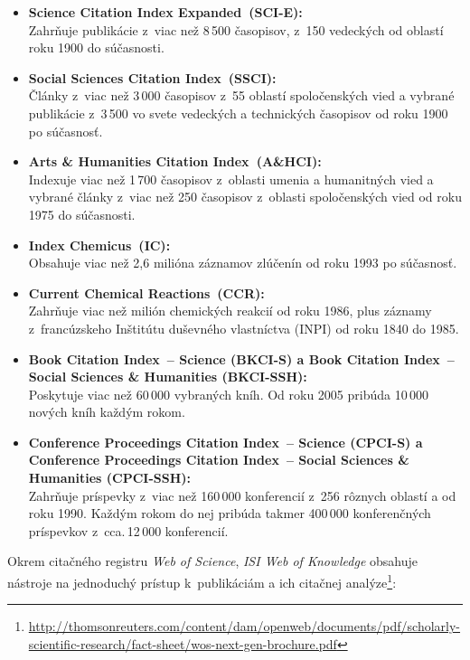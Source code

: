 \begin{itemize}
\item \textbf{Science Citation Index Expanded\R\ (SCI-E):}\\
  Zahrňuje publikácie z~viac než 8\,500 časopisov, z~150 vedeckých od oblastí
  roku 1900 do súčasnosti.
\item \textbf{Social Sciences Citation Index\R\ (SSCI):}\\
  Články z~viac než 3\,000 časopisov z~55 oblastí spoločenských vied a vybrané
  publikácie z~3\,500 vo svete vedeckých a technických časopisov od roku 1900 po
  súčasnosť.
\item \textbf{Arts \& Humanities Citation Index\R\ (A\&HCI):}\\
  Indexuje viac než 1\,700 časopisov z~oblasti umenia a humanitných vied a
  vybrané články z~viac než 250 časopisov z~oblasti spoločenských vied od roku
  1975 do súčasnosti.
\item \textbf{Index Chemicus\R\ (IC):}\\
  Obsahuje viac než 2,6 milióna záznamov zlúčenín od roku 1993 po súčasnosť.
\item \textbf{Current Chemical Reactions\R\ (CCR):}\\
  Zahrňuje viac než milión chemických reakcií od roku 1986, plus záznamy
  z~francúzskeho Inštitútu duševného vlastníctva (INPI) od roku 1840 do 1985.
\item \textbf{Book Citation Index\R\ -- Science (BKCI-S) a Book Citation
    Index\R\ -- Social Sciences \& Humanities (BKCI-SSH):}\\
  Poskytuje viac než 60\,000 vybraných kníh.  Od roku 2005 pribúda 10\,000
  nových kníh každým rokom.
\item \textbf{Conference Proceedings Citation Index\R\ -- Science (CPCI-S) a
    Conference Proceedings Citation Index\R\ -- Social Sciences \& Humanities
    (CPCI-SSH):}\\ Zahrňuje príspevky z~viac než 160\,000 konferencií z~256
  rôznych oblastí  a  od roku 1990.  Každým rokom do nej pribúda takmer 400\,000
  konferenčných príspevkov z~cca.\,12\,000 konferencií.
\end{itemize}


Okrem citačného registru \emph{Web of Science}, \emph{ISI Web of Knowledge}
obsahuje nástroje na jednoduchý prístup k~publikáciám a ich citačnej
analýze\footnote{\url{http://thomsonreuters.com/content/dam/openweb/documents/pdf/scholarly-scientific-research/fact-sheet/wos-next-gen-brochure.pdf}}:

